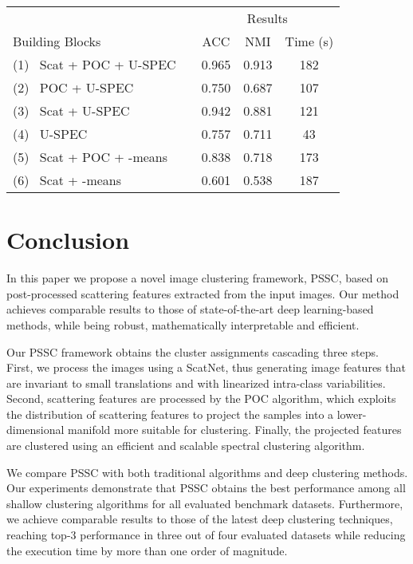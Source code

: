\documentclass[11pt]{article}
\theoremstyle{definition}
\begin{document}
\begin{table}[tb]
	\centering
	\label{table:ablation study}
\begin{tabular}{|lr|ccc|}
		\hline
		&&  \multicolumn{3}{c|}{Results}\\
		Building Blocks && ACC & NMI & Time (s)\\
		\hline
(1) ~Scat + POC + U-SPEC && 0.965 & 0.913 & 182 \\
(2) ~POC + U-SPEC && 0.750 & 0.687 & 107 \\
(3) ~Scat + U-SPEC && 0.942 & 0.881 & 121 \\
(4) ~U-SPEC && 0.757 & 0.711 & 43 \\
(5) ~Scat + POC + -means && 0.838 & 0.718 & 173 \\
(6) ~Scat + -means && 0.601 & 0.538 & 187 \\
		
		


		\hline
		
	\end{tabular}
\end{table}


\section{Conclusion}\label{sec:conclusion}

In this paper we propose a novel image clustering framework, PSSC, based on post-processed scattering features extracted from the input images. Our method achieves comparable results to those of state-of-the-art deep learning-based methods, while being robust, mathematically interpretable and efficient.

Our PSSC framework obtains the cluster assignments cascading three steps. First, we process the images using a ScatNet, thus generating image features that are invariant to small translations and with linearized intra-class variabilities. Second, scattering features are processed by the POC algorithm, which exploits the distribution of scattering features to project the samples into a lower-dimensional manifold more suitable for clustering. Finally, the projected features are clustered using an efficient and scalable spectral clustering algorithm.

We compare PSSC with both traditional algorithms and deep clustering methods. Our experiments demonstrate that PSSC obtains the best performance among all shallow clustering algorithms for all evaluated benchmark datasets. Furthermore, we achieve comparable results to those of the latest deep clustering techniques, reaching top-3 performance in three out of four evaluated datasets while reducing the execution time by more than one order of magnitude. 
\end{document}
